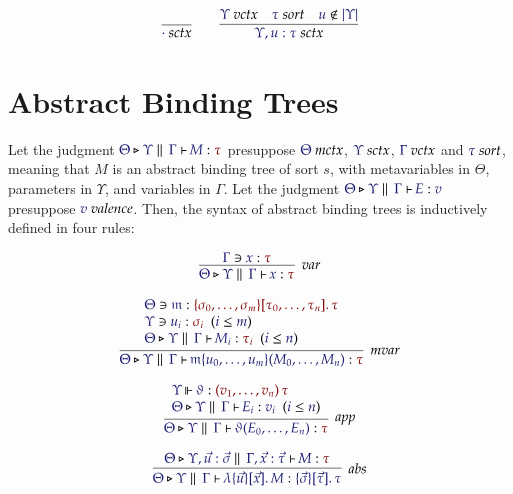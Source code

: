 \documentclass[11pt]{article}
\theoremstyle{definition}
\theoremstyle{remark}
\numberwithin{equation}{section}
\def\IModeColorName{MidnightBlue}
\def\OModeColorName{Maroon}
\newcommand\IMode[1]{{\color{\IModeColorName}{#1}}}
\newcommand\OMode[1]{{\color{\OModeColorName}{#1}}}
\newcommand\HypJ[2]{#1\ \ (#2)}
\newcommand\MkValence[3]{%
  \ifthenelse{\equal{#1}{}}{}{%
    \{#1\}%
  }%
  \ifthenelse{\equal{#2}{}}{}{%
    [#2]%
  }.\, #3%
}
\newcommand\MkBTm[3]{\mathbb{\lambda}\{#1\}[#2].\, #3}
\newcommand\MkArity[2]{(#1)\, #2}
\newcommand\IsValence[1]{\IMode{#1}\ \textit{valence}}
\newcommand\IsSort[1]{\IMode{#1}\ \textit{sort}}
\newcommand\Leq[2]{\IMode{#1}\leq\IMode{#2}}
\newcommand\IsOperator[3]{
  \IMode{#1}\,{\Vdash}\,\IMode{#2}: \OMode{#3}
}
\newcommand\IsMetaCtx[1]{\IMode{#1}\ \textit{mctx}}
\newcommand\IsVarCtx[1]{\IMode{#1}\ \textit{vctx}}
\newcommand\IsSymCtx[1]{\IMode{#1}\ \textit{sctx}}
\newcommand\Lookup[3]{\IMode{#1}\ni\IMode{#2}:\OMode{#3}}
\newcommand\IsAbt[5]{%
  \IMode{#1}\triangleright%
  \IMode{#2}\parallel%
  \,{\IMode{#3}\vdash}\,%
  \IMode{#4}:\OMode{#5}%
}
\newcommand\IsBTm[5]{%
  \IMode{#1}\triangleright%
  \IMode{#2}\parallel%
  \,{\IMode{#3}\vdash}\,%
  \IMode{#4}:\IMode{#5}%
}
\newcommand\MV[1]{\mathfrak{#1}}
\newcommand\MApp[3]{#1\{#2\}(#3)}
\newcommand\App[2]{#1(#2)}
\newcommand\Dom[1]{\left\vert#1\right\vert}
\newcommand\NotIn[2]{\IMode{#1}\notin\IMode{#2}}
\begin{document}
\begin{gather*}
  \infer{
    \IsSymCtx{\cdot}
  }{
  }
\qquad
  \infer{
    \IsSymCtx{\Upsilon,u:\tau}
  }{
    \IsVarCtx{\Upsilon}
&
    \IsSort{\tau}
&
    \NotIn{u}{\Dom\Upsilon}
  }
\end{gather*}

\section{Abstract Binding Trees}

Let the judgment $\IsAbt{\Theta}{\Upsilon}{\Gamma}{M}{\tau}$ presuppose
$\IsMetaCtx{\Theta}$, $\IsSymCtx\Upsilon$, $\IsVarCtx\Gamma$ and
$\IsSort{\tau}$, meaning that $M$ is an abstract binding tree of sort $s$, with
metavariables in $\Theta$, parameters in $\Upsilon$, and variables in $\Gamma$.
Let the judgment $\IsBTm{\Theta}{\Upsilon}{\Gamma}{E}{v}$ presuppose
$\IsValence{v}$. Then, the syntax of abstract binding trees is inductively
defined in four rules:

\begin{gather*}
  \infer[\textit{var}]{
    \IsAbt{\Theta}{\Upsilon}{\Gamma}{x}{\tau}
  }{
    \Lookup{\Gamma}{x}{\tau}
  }
\\[6pt]
  \infer[\textit{mvar}]{
    \IsAbt{\Theta}{\Upsilon}{\Gamma}{
      \MApp{\MV{m}}{u_0,\dots,u_m}{M_0,\dots,M_n}
    }{\tau}
  }{
    \begin{array}{l}
      \Lookup{\Theta}{\MV{m}}{
        \MkValence{
          \sigma_0,\dots,\sigma_m
        }{
          \tau_0,\dots,\tau_n
        }{\tau}
      }
\\
      \HypJ{
        \Lookup{\Upsilon}{u_i}{\sigma_i}
      }{\Leq{i}{m}}
\\
      \HypJ{
        \IsAbt{\Theta}{\Upsilon}{\Gamma}{M_i}{\tau_i}
      }{\Leq{i}{n}}
    \end{array}
  }
\\[6pt]
  \infer[\textit{app}]{
    \IsAbt{\Theta}{\Upsilon}{\Gamma}{
      \App{\vartheta}{E_0,\dots,E_n}
    }{\tau}
  }{
    \begin{array}{l}
      \IsOperator{\Upsilon}{\vartheta}{
        \MkArity{v_1,\dots,v_n}{\tau}
      }
\\
      \HypJ{
        \IsBTm{\Theta}{\Upsilon}{\Gamma}{E_i}{v_i}
      }{\Leq{i}{n}}
    \end{array}
  }
\\[6pt]
  \infer[\textit{abs}]{
    \IsBTm{\Theta}{\Upsilon}{\Gamma}{
      \MkBTm{\vec{u}}{\vec{x}}{M}
    }{
      \MkValence{\vec{\sigma}}{\vec{\tau}}{\tau}
    }
  }{
    \IsAbt{
      \Theta
    }{
      \Upsilon, \vec{u}:\vec{\sigma}
    }{
      \Gamma,\vec{x}:{\vec{\tau}}
    }{
      M
    }{\tau}
  }
\end{gather*}
\end{document}
